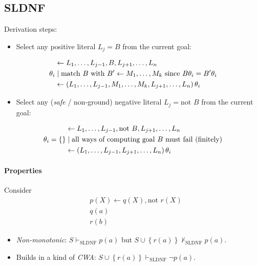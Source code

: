 \documentclass[twocolumn,english]{article}
\begin{document}
\subsection{SLDNF}

Derivation steps:
\begin{itemize}
\item Select any positive literal $L_{j}=B$ from the current goal:
\end{itemize}
\begin{align*}
\: & \leftarrow L_{1},\dots,L_{j-1},B,L_{j+1},\dots,L_{n}\\
\theta_{i} & \mid\text{match \ensuremath{B} with \ensuremath{B'\leftarrow M_{1},\dots,M_{k}} since \ensuremath{B\theta_{i}=B'\theta_{i}}}\\
\: & \leftarrow\left(L_{1},\dots,L_{j-1},M_{1},\dots,M_{k},L_{j+1},\dots,L_{n}\right)\theta_{i}
\end{align*}
\begin{itemize}
\item Select any (\emph{safe} / non-ground) negative literal $L_{j}=\text{not }B$
from the current goal:
\end{itemize}
\begin{align*}
\: & \leftarrow L_{1},\dots,L_{j-1},\text{not }B,L_{j+1},\dots,L_{n}\\
\theta_{i}=\{\} & \mid\text{all ways of computing goal \ensuremath{B} must fail (finitely)}\\
\: & \leftarrow\left(L_{1},\dots,L_{j-1},L_{j+1},\dots,L_{n}\right)\theta_{i}
\end{align*}

\paragraph{Properties}

Consider
\begin{align*}
 & p\left(X\right)\leftarrow q\left(X\right),\text{not }r\left(X\right)\\
 & q\left(a\right)\\
 & r\left(b\right)
\end{align*}
\begin{itemize}
\item \emph{Non-monotonic}: $S\vdash_{\text{SLDNF}}p\left(a\right)$ but
$S\cup\left\{ r\left(a\right)\right\} \not\vdash_{\text{SLDNF}}p\left(a\right)$.
\item Builds in a kind of \emph{CWA}: $S\cup\left\{ r\left(a\right)\right\} \vdash_{\text{SLDNF}}\lnot p\left(a\right)$.
\end{itemize}
\end{document}
